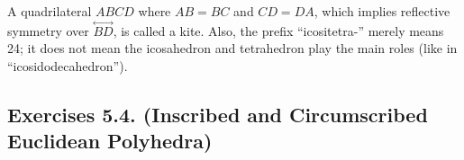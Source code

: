 \documentclass[leqno]{book}
\begin{document}
A quadrilateral $ABCD$ where $AB=BC$ and $CD=DA$, which implies reflective symmetry over $\overset{\longleftrightarrow}{BD}$, is called a kite.  Also, the prefix ``icositetra-'' merely means 24; it does not mean the icosahedron and tetrahedron play the main roles (like in ``icosidodecahedron'').

\subsection*{Exercises 5.4. (Inscribed and Circumscribed Euclidean Polyhedra)} %
\end{document}
